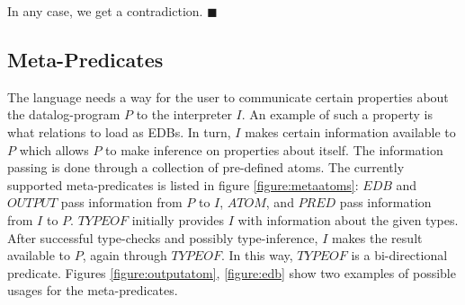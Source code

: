In any case, we get a contradiction. $\blacksquare$

\subsection{Meta-Predicates}
The language needs a way for the user to communicate certain properties about the datalog-program $P$ to the interpreter $I$.
An example of such a property is what relations to load as EDBs.
In turn, $I$ makes certain information available to $P$ which allows $P$ to make inference on properties about itself.
The information passing is done through a collection of pre-defined atoms. The currently supported meta-predicates is listed in figure \ref{figure:metaatoms}: $EDB$ and $OUTPUT$ pass information from $P$ to $I$, $ATOM$, and $PRED$ pass information from $I$ to $P$. $TYPEOF$ initially provides $I$ with information about the given types. After successful type-checks and possibly type-inference, $I$ makes the result available to $P$, again through $TYPEOF$. In this way, $TYPEOF$ is a bi-directional predicate. Figures \ref{figure:outputatom}, \ref{figure:edb} show two examples of possible usages for the meta-predicates.

